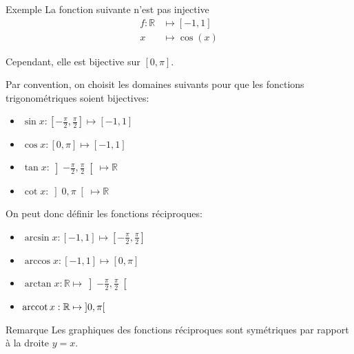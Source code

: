 \documentclass[a4paper]{article}
\begin{document}
\begin{parag}{Exemple}
    La fonction suivante n'est pas injective
    \[\begin{split}
        f: \mathbb{R} &\longmapsto \left[-1, 1\right]  \\
        x &\longmapsto \cos\left(x\right)
    \end{split}\]

    Cependant, elle est bijective sur $\left[0, \pi\right] $.

    Par convention, on choisit les domaines suivants pour que les fonctions trigonométriques soient bijectives:
    \begin{itemize}
        \item $\sin x : \left[-\frac{\pi}{2}, \frac{\pi}{2}\right] \mapsto \left[-1, 1\right] $
        \item $\cos x : \left[0, \pi\right] \mapsto \left[-1, 1\right] $
        \item $\tan x : \left]-\frac{\pi}{2}, \frac{\pi}{2}\right[ \mapsto \mathbb{R}$
        \item $\cot x : \left]0, \pi\right[ \mapsto \mathbb{R}$
    \end{itemize}

    On peut donc définir les fonctions réciproques:
    \begin{itemize}
        \item $\arcsin x : \left[-1, 1\right] \mapsto \left[-\frac{\pi}{2}, \frac{\pi}{2}\right]$
        \item $\arccos x : \left[-1, 1\right] \mapsto \left[0, \pi\right]$
        \item $\arctan x : \mathbb{R} \mapsto \left]-\frac{\pi}{2}, \frac{\pi}{2}\right[$
        \item $\arccot x : \mathbb{R} \mapsto \left]0, \pi\right[$
    \end{itemize}
\end{parag}

\begin{parag}{Remarque}
    Les graphiques des fonctions réciproques sont symétriques par rapport à la droite $y = x$.
\end{parag}
\end{document}
